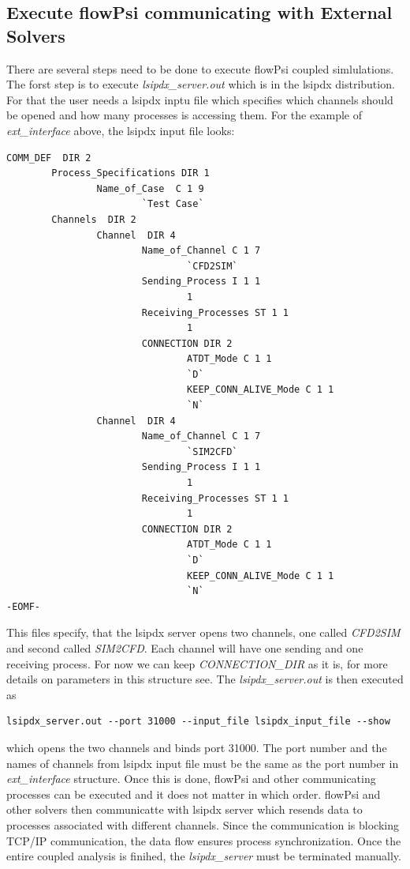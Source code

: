 \documentclass{article}
\begin{document}
\subsection{Execute flowPsi communicating with External Solvers}
There are several steps need to be done to execute flowPsi coupled simlulations.
The forst step is to execute \emph{lsipdx\_server.out} which is in the lsipdx distribution.
For that the user needs a lsipdx inptu file which specifies which channels should be opened and 
how many processes is accessing them. For the example of \emph{ext\_interface} above, the lsipdx input file looks:
\begin{verbatim}
COMM_DEF  DIR 2
        Process_Specifications DIR 1
                Name_of_Case  C 1 9 
                        `Test Case`
        Channels  DIR 2
                Channel  DIR 4
                        Name_of_Channel C 1 7
                                `CFD2SIM`
                        Sending_Process I 1 1
                                1
                        Receiving_Processes ST 1 1
                                1
                        CONNECTION DIR 2
                                ATDT_Mode C 1 1
                                `D`
                                KEEP_CONN_ALIVE_Mode C 1 1
                                `N`
                Channel  DIR 4
                        Name_of_Channel C 1 7
                                `SIM2CFD`
                        Sending_Process I 1 1
                                1
                        Receiving_Processes ST 1 1
                                1
                        CONNECTION DIR 2
                                ATDT_Mode C 1 1
                                `D`
                                KEEP_CONN_ALIVE_Mode C 1 1
                                `N`
-EOMF-
\end{verbatim}
This files specify, that the lsipdx server opens two channels, one called \emph{CFD2SIM} and second called \emph{SIM2CFD}.
Each channel will have one sending and one receiving process. For now we can keep \emph{CONNECTION\_DIR} as it is, 
for more details on parameters in this structure see\cite{Jirasek_2014}.
The \emph{lsipdx\_server.out}  is then executed as
\begin{verbatim}
lsipdx_server.out --port 31000 --input_file lsipdx_input_file --show
\end{verbatim}
which opens the two channels and binds port 31000. The port number and the names of channels from lsipdx input file
must be the same as the port number in \emph{ext\_interface} structure.
Once this is done, flowPsi and other communicating processes can be executed and it does not matter in which order.
flowPsi and other solvers then communicatte with lsipdx server which resends data to processes associated with 
different channels. Since the communication is blocking TCP/IP communication, the data flow 
ensures process synchronization. Once the entire coupled analysis is finihed, the \emph{lsipdx\_server} must be terminated manually. 
\end{document}
